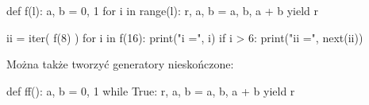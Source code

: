 \begin{CodeFrame*}[python]{}
def f(l):
    a, b = 0, 1
    for i in range(l):
        r, a, b = a, b, a + b
        yield r

ii = iter( f(8) )
for i in f(16):
    print("i =", i)
    if i > 6:
        print("ii =", next(ii))
\end{CodeFrame*}

Można także tworzyć generatory nieskończone:

\begin{CodeFrame*}[python]{}
def ff():
    a, b = 0, 1
    while True:
        r, a, b = a, b, a + b
        yield r
\end{CodeFrame*}
